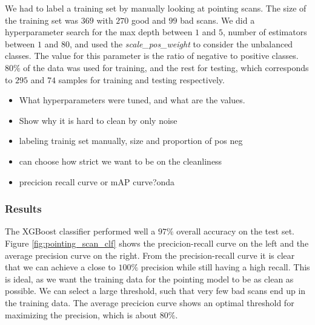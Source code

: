 We had to label a training set by manually looking at pointing scans.
The size of the training set was $369$ with $270$ good and $99$ bad scans.
We did a hyperparameter search for the max depth between $1$ and $5$, number of estimators between $1$ and $80$, 
and used the \textit{scale\_pos\_weight} to consider the unbalanced classes. The value for this parameter is the ratio of negative to positive classes.
$80\%$ of the data was used for training, and the rest for testing, which corresponds to $295$ and $74$ samples for training and testing respectively.


\begin{itemize}
    \item What hyperparameters were tuned, and what are the values.
    \item Show why it is hard to clean by only noise
    \item labeling trainig set manually, size and proportion of pos neg
    \item can choose how strict we want to be on the cleanliness
    \item precicion recall curve or mAP curve?onda
\end{itemize}

\subsubsection{Results}
The XGBoost classifier performed well a $97\%$ overall accuracy on the test set.
Figure \ref{fig:pointing_scan_clf} shows the precicion-recall curve on the left and the average precision curve on the right.
From the precision-recall curve it is clear that we can achieve a close to $100\%$ precision while still having a high recall.
This is ideal, as we want the training data for the pointing model to be as clean as possible.
We can select a large threshold, such that very few bad scans end up in the training data.
The average precicion curve shows an optimal threshold for maximizing the precision, which is about $80\%$.

